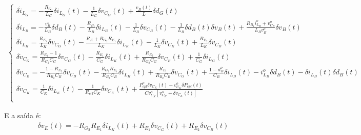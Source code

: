 \documentclass{article}
\newcommand{\ds}{\displaystyle}
\begin{document}
\begin{gather}
  \begin{cases}
    \delta \dot{i}_{L_G} = \ds - \frac{R_{G_1}}{L_G} \delta i_{L_G}(t) - \frac{1}{L_G} \delta v_{C_G}(t) + \frac{v_B(t)}{L} \delta d_G(t) \\[14pt]
    \delta \dot{i}_{L_B} = \ds - \frac{v_B^o}{L_B} \delta d_B(t) - \frac{R_{B_1}}{L_B} \delta i_{L_B}(t)
    - \frac{1}{L_B} \delta v_{C_B}(t) - \frac{1}{L_B} \delta d_B(t) \delta v_B(t)
    + \frac{R_{B_1} i_{L_B}^o + v_{C_B}^o}{L_B v_B^o} \delta v_B(t)                                                                       \\[14pt]
    \delta \dot{i}_{L_K} = \ds \frac{R_{E_1}}{L_K} \delta v_{C_G}(t) - \frac{R_K+R_{G_2}R_{E_1}}{L_K} \delta i_{L_K}(t)
    - \frac{1}{L_K} \delta v_{C_K}(t) + \frac{R_{E_2}}{L_K} \delta v_{C_B}(t)                                                             \\[14pt]
    \delta \dot{v}_{C_G} = \ds \frac{R_{E_1} - 1}{R_{G_2} C_G} \delta v_{C_G}(t)
    - \frac{R_{E_1}}{C_G} \delta i_{L_K}(t)
    + \frac{R_{E_2}}{R_{G_2} C_G} \delta v_{C_B}(t) + \frac{1}{C_G} \delta i_{L_G}(t)                                                     \\[14pt]
    \delta \dot{v}_{C_B} = \ds - \frac{1 - R_{E_2}}{R_{B_2}C_B} \delta v_{C_B}(t)
    - \frac{R_{G_2} R_{E_1}}{R_{B_2}C_B} \delta i_{L_K}(t)
    + \frac{R_{E_1}}{R_{B_2}C_B} \delta v_{C_G}(t)
    + \frac{1 - d_B^o}{C_B} \delta i_{L_B}(t)
    - i_{L_B}^o \delta d_B(t) - \delta i_{L_B}(t) \delta d_B(t)                                                                           \\[14pt]
    \delta \dot{v}_{C_K} = \ds \frac{1}{C_K} \delta i_{L_K}(t)
    - \frac{1}{R_{crl} C_K} \delta v_{C_K}(t)
    + \frac{P_{cpl}^o \delta v_{C_K}(t) - v_{C_K}^o \delta P_{cpl}(t)}{Cv_{C_K}^o\left[v_{C_K}^o + \delta v_{C_K}(t)\right]}              \\[14pt]
  \end{cases}
\end{gather}

E a saída é:
\begin{gather}
  \delta v_E(t) = - R_{G_2} R_{E_1} \delta i_{L_K}(t) + R_{E_1} \delta v_{C_G}(t) + R_{E_2} \delta v_{C_B}(t)
\end{gather}


\end{document}
